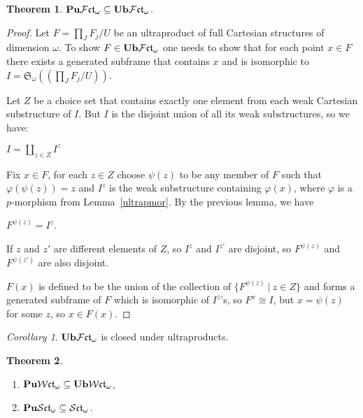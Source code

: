 \documentclass{article}
\theoremstyle{defin}
\theoremstyle{theorem}
\newtheorem{theorem}{Theorem}
\theoremstyle{claim}
\theoremstyle{prop}
\theoremstyle{lemma}
\theoremstyle{fact}
\theoremstyle{remark}
\theoremstyle{ex}
\theoremstyle{col}
\newtheorem{col}{Corollary}
\theoremstyle{question}
\begin{document}
\begin{theorem} \label{puub}
${\bf Pu}\mathcal{F}\mathfrak{ct}_{\omega} \subseteq {\bf Ub}\mathcal{F}\mathfrak{ct}_{\omega}$.
\end{theorem}

\begin{proof}
Let $F = \prod \limits_J F_j / U$ be an ultraproduct of full Cartesian structures of dimension $\omega$. To show $F \in {\bf Ub}\mathcal{F}\mathfrak{ct}_{\omega}$ one needs to show that for each point $x \in F$ there exists a generated subframe that contains $x$ and is isomorphic to $I = \mathfrak{S}_{\omega}((\prod \limits_J F_j / U))$.

Let $Z$ be a choice set that contains exactly one element from each weak Cartesian substructure of $I$. But $I$ is the disjoint union of all its weak substructures, so we have:
\begin{center}
$I = \coprod \limits_{z \in Z} I^z$
\end{center}
Fix $x \in F$, for each $z \in Z$ choose $\psi(z)$ to be any member of $F$ such that $\varphi(\psi(z)) = z$ and $I^z$ is the weak substructure containing $\varphi(x)$, where $\varphi$ is a $p$-morphism from Lemma~\ref{ultrapmor}. By the previous lemma, we have
\begin{center}
$F^{\psi(z)} = I^z$.
\end{center}

If $z$ and $z'$ are different elements of $Z$, so $I^z$ and $I^{z'}$ are disjoint, so $F^{\psi(z)}$ and $F^{\psi(z')}$ are also disjoint. 

$F(x)$ is defined to be the union of the collection of $\{ F^{\psi(z)} \: | \: z \in Z \}$ and forms a generated subframe of $F$ which is isomorphic of $I^z$'s, so $F^x \cong I$, but $x = \psi(z)$ for some $z$, so $x \in F(x)$. 
\end{proof}

\begin{col}
${\bf Ub}\mathcal{F}\mathfrak{ct}_{\omega}$ is closed under ultraproducts.
\end{col}

\begin{theorem}
$ $

\begin{enumerate}
\item ${\bf Pu}\mathcal{W}\mathfrak{ct}_{\omega} \subseteq {\bf Ub}\mathcal{W}\mathfrak{ct}_{\omega}$,
\item ${\bf Pu}\mathcal{S}\mathfrak{ct}_{\omega} \subseteq \mathcal{S}\mathfrak{ct}_{\omega}$.
\end{enumerate}
\end{theorem}
\end{document}
